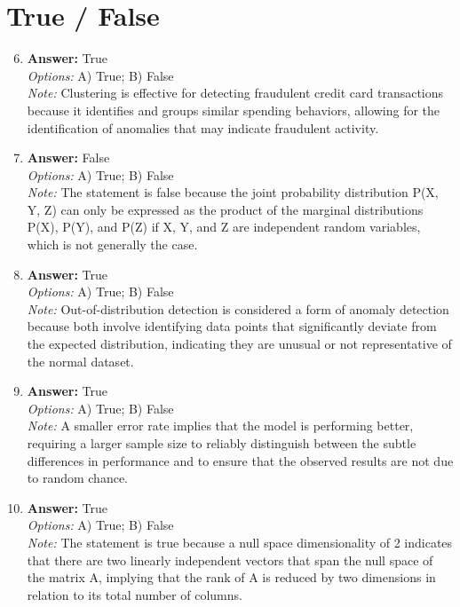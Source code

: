 \documentclass[12pt]{article}
\begin{document}
\section*{True / False}
\begin{enumerate}[label=\arabic*.]
\setcounter{enumi}{5}
\item \textbf{Answer:} True
\\ \textit{Options:} A) True; B) False
\\ \textit{Note:} Clustering is effective for detecting fraudulent credit card transactions because it identifies and groups similar spending behaviors, allowing for the identification of anomalies that may indicate fraudulent activity.
\item \textbf{Answer:} False
\\ \textit{Options:} A) True; B) False
\\ \textit{Note:} The statement is false because the joint probability distribution P(X, Y, Z) can only be expressed as the product of the marginal distributions P(X), P(Y), and P(Z) if X, Y, and Z are independent random variables, which is not generally the case.
\item \textbf{Answer:} True
\\ \textit{Options:} A) True; B) False
\\ \textit{Note:} Out-of-distribution detection is considered a form of anomaly detection because both involve identifying data points that significantly deviate from the expected distribution, indicating they are unusual or not representative of the normal dataset.
\item \textbf{Answer:} True
\\ \textit{Options:} A) True; B) False
\\ \textit{Note:} A smaller error rate implies that the model is performing better, requiring a larger sample size to reliably distinguish between the subtle differences in performance and to ensure that the observed results are not due to random chance.
\item \textbf{Answer:} True
\\ \textit{Options:} A) True; B) False
\\ \textit{Note:} The statement is true because a null space dimensionality of 2 indicates that there are two linearly independent vectors that span the null space of the matrix A, implying that the rank of A is reduced by two dimensions in relation to its total number of columns.
\end{enumerate}
\end{document}
